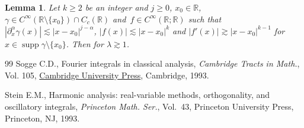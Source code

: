 \documentclass[11pt]{article}
\numberwithin{equation}{section}
\newtheorem{Lemma}[Theorem]{Lemma}
\def\R{\mathbb{R}}%
\DeclareMathOperator{\supp}{supp}%
\def\a{\alpha}
\def\c{\gamma}
\def\l{\lambda}
\def\pa{\partial}
\begin{document}
\begin{Lemma}\label{stphaselem}
Let $k\geq 2$ be an integer and $j\geq 0$, $x_0\in \R$, $\c\in C^{\infty}(\R\setminus \{x_0\})\cap C_c(\R)$ and~${f\in C^{\infty}(\R;\R)}$ such that $|\pa_x^{\a}\c(x)|\lesssim |x-x_0|^{j-\a}$, $|f(x)|\lesssim |x-x_0|^k$ and $|f'(x)|\gtrsim |x-x_0|^{k-1}$ for $x\in \supp \c\setminus \{x_0\}$.
Then \smash{$|I(\l)|\lesssim \l^{-\frac{j+1}{k}}$} for $\l\gtrsim 1$.
\end{Lemma}

\begin{thebibliography}{99}
Sogge C.D., Fourier integrals in classical analysis, \textit{Cambridge Tracts
 in Math.}, Vol. 105, \href{https://doi.org/10.1017/CBO9780511530029}{Cambridge University Press}, Cambridge, 1993.

Stein E.M., Harmonic analysis: real-variable methods, orthogonality, and
 oscillatory integrals, \textit{Princeton Math. Ser.}, Vol.~43, Princeton
 University Press, Princeton, NJ, 1993.

\end{thebibliography}
\end{document}
